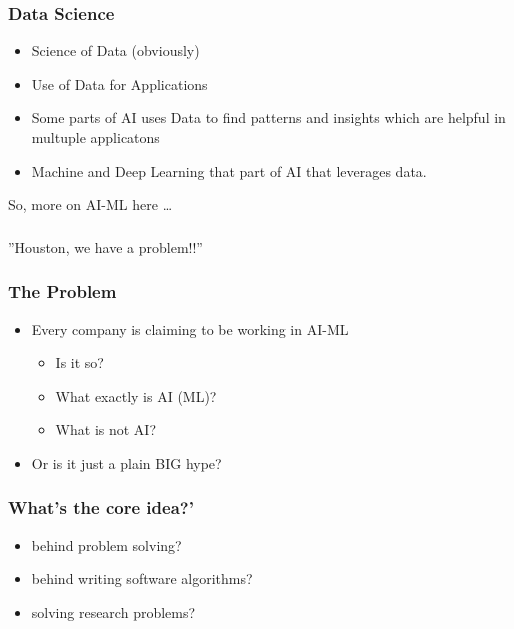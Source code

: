 \begin{frame}[fragile]\frametitle{Data Science}

\begin{itemize}
\item Science of Data (obviously)
\item Use of Data for Applications
\item Some parts of AI uses Data to find patterns and insights which are helpful in multuple applicatons
\item Machine and Deep Learning that part of AI that leverages data.
\end{itemize}

So, more on AI-ML here \ldots

\end{frame}


\begin{frame}[fragile]\frametitle{}
\begin{center}
{\Large ''Houston, we have a problem!!''}
\end{center}
\end{frame}

\begin{frame}[fragile]\frametitle{The Problem}

\begin{itemize}
\item Every company is claiming to be working in AI-ML
\begin{itemize}
\item Is it so?
\item What exactly is AI (ML)?
\item What is not AI?
\end{itemize}

\item Or is it just a plain BIG hype?

\end{itemize}
	  
\end{frame}


\begin{frame}[fragile]\frametitle{What's the core idea?'}
\begin{itemize}
\item behind problem solving?
\item behind writing software algorithms?
\item solving research problems?
\end{itemize}
\end{frame}

